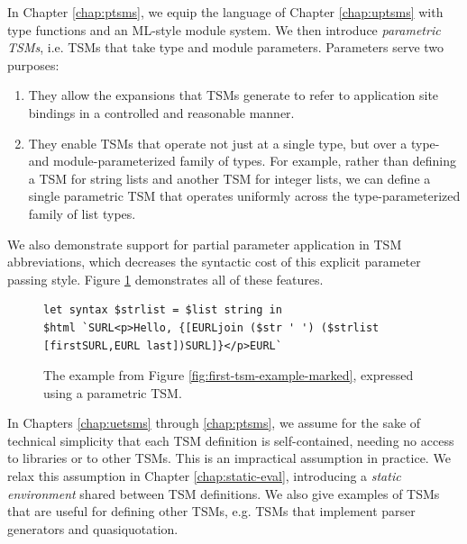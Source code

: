 In Chapter \ref{chap:ptsms}, we equip the language of Chapter \ref{chap:uptsms} with type functions and an ML-style module system. We then introduce \emph{parametric TSMs}, i.e. TSMs that take type and module parameters. Parameters serve two purposes:
\begin{enumerate}
\item They allow the expansions that TSMs generate to refer to application site bindings in a controlled and reasonable manner. 
\item They enable TSMs that operate not just at a single type, but over a type- and module-parameterized family of types. For example, rather than defining a TSM  for string lists and another TSM  for integer lists, we can define a single parametric TSM  that operates uniformly across the type-parameterized family of list types. 
\end{enumerate}
We also demonstrate support for partial parameter application in TSM abbreviations, which decreases the syntactic cost of this explicit parameter passing style. Figure \ref{fig:first-ptsm-example-marked} demonstrates all of these features.

\begin{figure}[h]
\begin{lstlisting}[numbers=none,xleftmargin=0px]
let syntax $strlist = $list string in 
$html `SURL<p>Hello, {[EURLjoin ($str ' ') ($strlist [firstSURL,EURL last])SURL]}</p>EURL`
\end{lstlisting}
\caption{The example from Figure \ref{fig:first-tsm-example-marked}, expressed using a parametric TSM.}
\label{fig:first-ptsm-example-marked}
\end{figure}

In Chapters \ref{chap:uetsms} through \ref{chap:ptsms}, we assume for the sake of technical simplicity that each TSM definition is self-contained, needing no access to libraries or to other TSMs. This is an impractical assumption in practice. We relax this assumption in Chapter \ref{chap:static-eval}, introducing a \emph{static environment} shared between TSM definitions. We also give examples of TSMs that are useful for defining other TSMs, e.g. TSMs that implement parser generators and quasiquotation.

